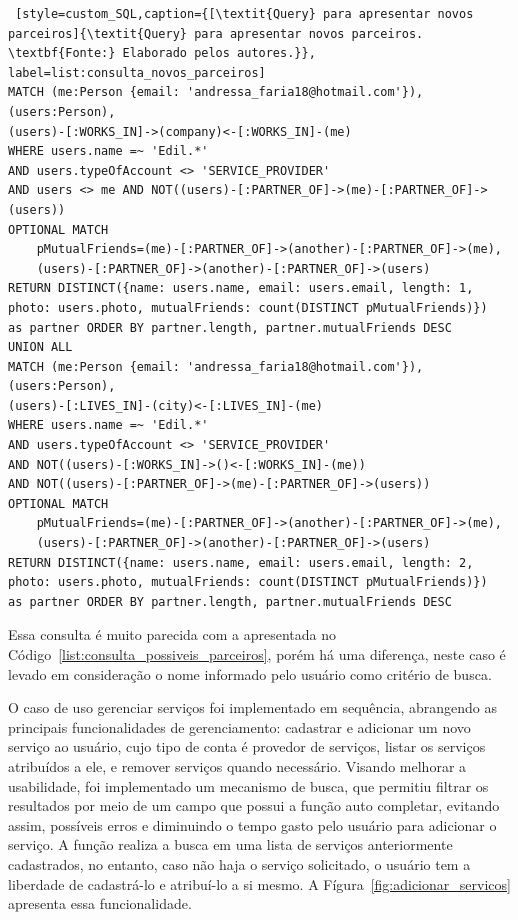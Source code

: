 \begin{lstlisting} [style=custom_SQL,caption={[\textit{Query} para apresentar novos parceiros]{\textit{Query} para apresentar novos parceiros. \textbf{Fonte:} Elaborado pelos autores.}}, label=list:consulta_novos_parceiros] 	
MATCH (me:Person {email: 'andressa_faria18@hotmail.com'}), (users:Person),
(users)-[:WORKS_IN]->(company)<-[:WORKS_IN]-(me)
WHERE users.name =~ 'Edil.*'
AND users.typeOfAccount <> 'SERVICE_PROVIDER'
AND users <> me AND NOT((users)-[:PARTNER_OF]->(me)-[:PARTNER_OF]->(users))  
OPTIONAL MATCH 
	pMutualFriends=(me)-[:PARTNER_OF]->(another)-[:PARTNER_OF]->(me), 
	(users)-[:PARTNER_OF]->(another)-[:PARTNER_OF]->(users) 
RETURN DISTINCT({name: users.name, email: users.email, length: 1, 
photo: users.photo, mutualFriends: count(DISTINCT pMutualFriends)}) 
as partner ORDER BY partner.length, partner.mutualFriends DESC 
UNION ALL 
MATCH (me:Person {email: 'andressa_faria18@hotmail.com'}), (users:Person),
(users)-[:LIVES_IN]-(city)<-[:LIVES_IN]-(me)
WHERE users.name =~ 'Edil.*'
AND users.typeOfAccount <> 'SERVICE_PROVIDER' 
AND NOT((users)-[:WORKS_IN]->()<-[:WORKS_IN]-(me)) 
AND NOT((users)-[:PARTNER_OF]->(me)-[:PARTNER_OF]->(users)) 
OPTIONAL MATCH 
	pMutualFriends=(me)-[:PARTNER_OF]->(another)-[:PARTNER_OF]->(me), 
	(users)-[:PARTNER_OF]->(another)-[:PARTNER_OF]->(users) 
RETURN DISTINCT({name: users.name, email: users.email, length: 2, 
photo: users.photo, mutualFriends: count(DISTINCT pMutualFriends)})
as partner ORDER BY partner.length, partner.mutualFriends DESC
\end{lstlisting}

\par Essa consulta é muito parecida com a apresentada no Código~\ref{list:consulta_possiveis_parceiros}, porém há uma diferença, neste caso é levado em consideração o nome informado pelo usuário como critério de busca.
 

\par O caso de uso gerenciar serviços foi implementado em sequência, abrangendo as principais funcionalidades de gerenciamento: cadastrar e adicionar um novo serviço ao usuário, cujo tipo de conta é provedor de serviços, listar os serviços atribuídos a ele, e remover serviços quando necessário. Visando melhorar a usabilidade, foi implementado um mecanismo de busca, que permitiu filtrar os resultados por meio de um campo que possui a função  auto completar, evitando assim, possíveis erros e diminuindo o tempo gasto pelo usuário para adicionar o serviço. A função realiza a busca em uma lista de serviços anteriormente cadastrados, no entanto, caso não haja o serviço solicitado, o usuário tem a liberdade de cadastrá-lo e atribuí-lo a si mesmo. A Fígura~\ref{fig:adicionar_servicos} apresenta essa funcionalidade.

